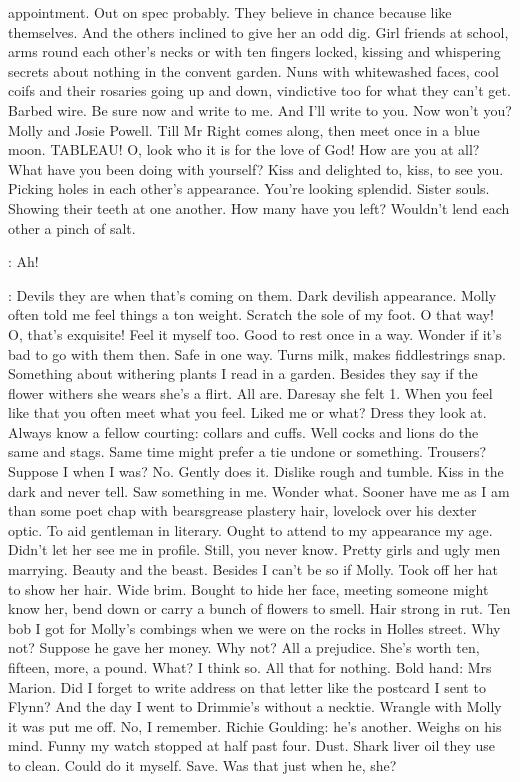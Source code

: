 appointment. Out on spec probably. They believe in chance because like
themselves. And the others inclined to give her an odd dig. Girl friends
at school, arms round each other's necks or with ten fingers locked,
kissing and whispering secrets about nothing in the convent garden. Nuns
with whitewashed faces, cool coifs and their rosaries going up and down,
vindictive too for what they can't get. Barbed wire. Be sure now and write
to me. And I'll write to you. Now won't you? Molly and Josie Powell. Till
Mr Right comes along, then meet once in a blue moon. TABLEAU! O, look
who it is for the love of God! How are you at all? What have you been
doing with yourself? Kiss and delighted to, kiss, to see you. Picking
holes in each other's appearance. You're looking splendid. Sister souls.
Showing their teeth at one another. How many have you left? Wouldn't lend
each other a pinch of salt.

\Bloom:
Ah!

\Bloom:
Devils they are when that's coming on them. Dark devilish appearance.
Molly often told me feel things a ton weight. Scratch the sole of
my foot. O that way! O, that's exquisite! Feel it myself too. Good to rest
once in a way. Wonder if it's bad to go with them then. Safe in one way.
Turns milk, makes fiddlestrings snap. Something about withering plants I
read in a garden. Besides they say if the flower withers she wears she's a
flirt. All are. Daresay she felt 1. When you feel like that you often meet
what you feel. Liked me or what? Dress they look at. Always know a fellow
courting: collars and cuffs. Well cocks and lions do the same and stags.
Same time might prefer a tie undone or something. Trousers? Suppose I
when I was? No. Gently does it. Dislike rough and tumble. Kiss in the dark
and never tell. Saw something in me. Wonder what. Sooner have me as I am
than some poet chap with bearsgrease plastery hair, lovelock over his
dexter optic. To aid gentleman in literary. Ought to attend to my
appearance my age. Didn't let her see me in profile. Still, you
never know. Pretty girls and ugly men marrying. Beauty and the
beast. Besides I can't be so if Molly. Took off her hat to show
her hair. Wide brim. Bought to hide her face, meeting someone might
know her, bend down or carry a bunch of flowers to smell. Hair
strong in rut. Ten bob I got for Molly's combings when we were on
the rocks in Holles street. Why not? Suppose he gave her money.
Why not? All a prejudice. She's worth ten, fifteen, more, a pound. What? I
think so. All that for nothing. Bold hand: Mrs Marion. Did I forget to
write address on that letter like the postcard I sent to Flynn? And the
day I went to Drimmie's without a necktie. Wrangle with Molly it was put
me off. No, I remember. Richie Goulding: he's another. Weighs on his mind.
Funny my watch stopped at half past four. Dust. Shark liver oil they use
to clean. Could do it myself. Save. Was that just when he, she?


